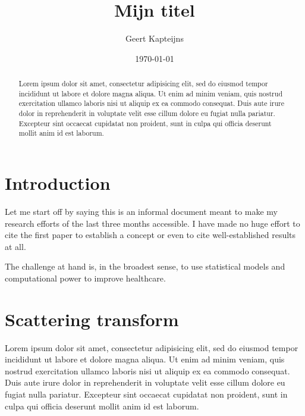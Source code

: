 \documentclass[twocolumn, openany, twoside, article]{memoir}
\title{Mijn titel}
\author{Geert Kapteijns}
\date{\today}
\begin{document}
\maketitle
\pagestyle{simple}

\begin{abstract}

Lorem ipsum dolor sit amet, consectetur adipisicing elit, sed do eiusmod
tempor incididunt ut labore et dolore magna aliqua. Ut enim ad minim veniam,
quis nostrud exercitation ullamco laboris nisi ut aliquip ex ea commodo
consequat. Duis aute irure dolor in reprehenderit in voluptate velit esse
cillum dolore eu fugiat nulla pariatur. Excepteur sint occaecat cupidatat non
proident, sunt in culpa qui officia deserunt mollit anim id est laborum.

\end{abstract}

\chapter{Introduction}

Let me start off by saying this is an informal document meant to make my
research efforts of the last three months accessible. I have made no huge effort
to cite the first paper to establish a concept or even to cite well-established
results at all.

The challenge at hand is, in the broadest sense, to use statistical models and computational power to improve healthcare.

\chapter{Scattering transform}


Lorem ipsum dolor sit amet, consectetur adipisicing elit, sed do eiusmod tempor
incididunt ut labore et dolore magna aliqua. Ut enim ad minim veniam, quis
nostrud exercitation ullamco laboris nisi ut aliquip ex ea commodo consequat.
Duis aute irure dolor in reprehenderit in voluptate velit esse cillum dolore eu
fugiat nulla pariatur. Excepteur sint occaecat cupidatat non proident, sunt in
culpa qui officia deserunt mollit anim id est laborum.
\cite{bruna2013invariant}
\end{document}
